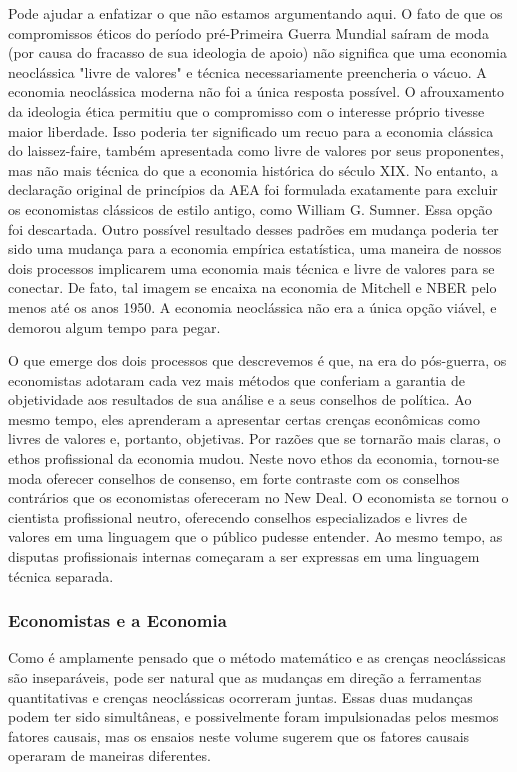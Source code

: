 \documentclass[a4paper,12pt]{article}[abntex2]
\begin{document}
Pode ajudar a enfatizar o que não estamos argumentando aqui. O fato de que os compromissos éticos do período pré-Primeira Guerra Mundial saíram de moda (por causa do fracasso de sua ideologia de apoio) não significa que uma economia neoclássica "livre de valores" e técnica necessariamente preencheria o vácuo. A economia neoclássica moderna não foi a única resposta possível. O afrouxamento da ideologia ética permitiu que o compromisso com o interesse próprio tivesse maior liberdade. Isso poderia ter significado um recuo para a economia clássica do laissez-faire, também apresentada como livre de valores por seus proponentes, mas não mais técnica do que a economia histórica do século XIX. No entanto, a declaração original de princípios da AEA foi formulada exatamente para excluir os economistas clássicos de estilo antigo, como William G. Sumner. Essa opção foi descartada. Outro possível resultado desses padrões em mudança poderia ter sido uma mudança para a economia empírica estatística, uma maneira de nossos dois processos implicarem uma economia mais técnica e livre de valores para se conectar. De fato, tal imagem se encaixa na economia de Mitchell e NBER pelo menos até os anos 1950. A economia neoclássica não era a única opção viável, e demorou algum tempo para pegar.

O que emerge dos dois processos que descrevemos é que, na era do pós-guerra, os economistas adotaram cada vez mais métodos que conferiam a garantia de objetividade aos resultados de sua análise e a seus conselhos de política. Ao mesmo tempo, eles aprenderam a apresentar certas crenças econômicas como livres de valores e, portanto, objetivas. Por razões que se tornarão mais claras, o ethos profissional da economia mudou. Neste novo ethos da economia, tornou-se moda oferecer conselhos de consenso, em forte contraste com os conselhos contrários que os economistas ofereceram no New Deal. O economista se tornou o cientista profissional neutro, oferecendo conselhos especializados e livres de valores em uma linguagem que o público pudesse entender. Ao mesmo tempo, as disputas profissionais internas começaram a ser expressas em uma linguagem técnica separada.

\subsubsection{\textbf{Economistas e a Economia}}
Como é amplamente pensado que o método matemático e as crenças neoclássicas são inseparáveis, pode ser natural que as mudanças em direção a ferramentas quantitativas e crenças neoclássicas ocorreram juntas. Essas duas mudanças podem ter sido simultâneas, e possivelmente foram impulsionadas pelos mesmos fatores causais, mas os ensaios neste volume sugerem que os fatores causais operaram de maneiras diferentes.
\end{document}
